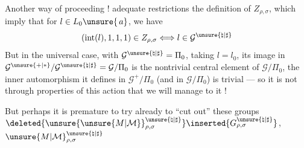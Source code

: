 Another way of proceeding !
  adequate restrictions 
the definition of $Z_{\rho,\sigma}$, which
imply that
for $l\in L_0\unsure{\,a}$, we have
\[
(\mathrm{int}(l),1,1,1)\in Z_{\rho,\sigma}
\Longleftrightarrow
l\in\mathcal{G}^{\unsure{\natural|\sharp}}
\]
But in the universal case, with
$\mathcal{G}^{\unsure{\natural|\sharp}}=\Pi_0$,
taking $l=l_0$, its image in
$\mathcal{G}^{\unsure{+|*}}/
\mathcal{G}^{\unsure{\natural|\sharp}}
=\mathcal{G}/\Pi_0$
is the nontrivial central element of
$\mathcal{G}/\Pi_0$,
the inner automorphism it defines in
$\mathcal{G}^+/\Pi_0$
(and  in
$\mathcal{G}/\Pi_0$)
is trivial --- so it is not through
 properties of this action
that we will manage to  it !

But perhaps it is premature to try already to ``cut out'' these groups
$\deleted{\unsure{\unsure{M|\mathcal{M}}}_{\rho,\sigma}^{\unsure{\natural|\sharp}}}
\inserted{G_{\rho,\sigma}^{\unsure{\natural|\sharp}}}$,
$\unsure{M|\mathcal{M}}_{\rho,\sigma}^{\unsure{\natural|\sharp}}$

